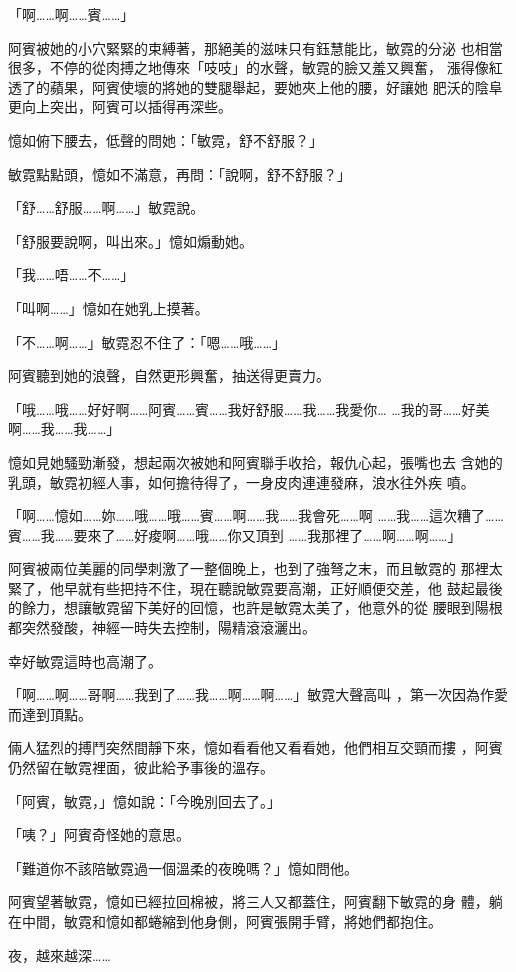 「啊……啊……賓……」

阿賓被她的小穴緊緊的束縛著，那絕美的滋味只有鈺慧能比，敏霓的分泌
也相當很多，不停的從肉搏之地傳來「吱吱」的水聲，敏霓的臉又羞又興奮，
漲得像紅透了的蘋果，阿賓使壞的將她的雙腿舉起，要她夾上他的腰，好讓她
肥沃的陰阜更向上突出，阿賓可以插得再深些。

憶如俯下腰去，低聲的問她：「敏霓，舒不舒服？」

敏霓點點頭，憶如不滿意，再問：「說啊，舒不舒服？」

「舒……舒服……啊……」敏霓說。

「舒服要說啊，叫出來。」憶如煽動她。

「我……唔……不……」

「叫啊……」憶如在她乳上摸著。

「不……啊……」敏霓忍不住了：「嗯……哦……」

阿賓聽到她的浪聲，自然更形興奮，抽送得更賣力。

「哦……哦……好好啊……阿賓……賓……我好舒服……我……我愛你…
…我的哥……好美啊……我……我……」

憶如見她騷勁漸發，想起兩次被她和阿賓聯手收拾，報仇心起，張嘴也去
含她的乳頭，敏霓初經人事，如何擔待得了，一身皮肉連連發麻，浪水往外疾
噴。

「啊……憶如……妳……哦……哦……賓……啊……我……我會死……啊
……我……這次糟了……賓……我……要來了……好痠啊……哦……你又頂到
……我那裡了……啊……啊……」

阿賓被兩位美麗的同學刺激了一整個晚上，也到了強弩之末，而且敏霓的
那裡太緊了，他早就有些把持不住，現在聽說敏霓要高潮，正好順便交差，他
鼓起最後的餘力，想讓敏霓留下美好的回憶，也許是敏霓太美了，他意外的從
腰眼到陽根都突然發酸，神經一時失去控制，陽精滾滾灑出。

幸好敏霓這時也高潮了。

「啊……啊……哥啊……我到了……我……啊……啊……」敏霓大聲高叫
，第一次因為作愛而達到頂點。

倆人猛烈的搏鬥突然間靜下來，憶如看看他又看看她，他們相互交頸而摟
，阿賓仍然留在敏霓裡面，彼此給予事後的溫存。

「阿賓，敏霓，」憶如說：「今晚別回去了。」

「咦？」阿賓奇怪她的意思。

「難道你不該陪敏霓過一個溫柔的夜晚嗎？」憶如問他。

阿賓望著敏霓，憶如已經拉回棉被，將三人又都蓋住，阿賓翻下敏霓的身
體，躺在中間，敏霓和憶如都蜷縮到他身側，阿賓張開手臂，將她們都抱住。

夜，越來越深……










